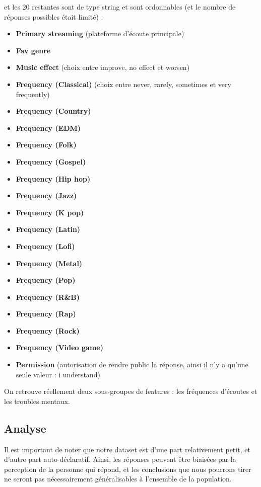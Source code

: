 \documentclass[
]{article}
\providecommand{\tightlist}{%
  \setlength{\itemsep}{0pt}\setlength{\parskip}{0pt}}
\begin{document}
et les 20 restantes sont de type string et sont ordonnables (et le
nombre de réponses possibles était limité) :

\begin{itemize}
\tightlist
\item
  \textbf{Primary streaming} (plateforme d'écoute principale)
\item
  \textbf{Fav genre}
\item
  \textbf{Music effect} (choix entre improve, no effect et worsen)
\item
  \textbf{Frequency (Classical)} (choix entre never, rarely, sometimes
  et very frequently)
\item
  \textbf{Frequency (Country)}
\item
  \textbf{Frequency (EDM)}
\item
  \textbf{Frequency (Folk)}
\item
  \textbf{Frequency (Gospel)}
\item
  \textbf{Frequency (Hip hop)}
\item
  \textbf{Frequency (Jazz)}
\item
  \textbf{Frequency (K pop)}
\item
  \textbf{Frequency (Latin)}
\item
  \textbf{Frequency (Lofi)}
\item
  \textbf{Frequency (Metal)}
\item
  \textbf{Frequency (Pop)}
\item
  \textbf{Frequency (R\&B)}
\item
  \textbf{Frequency (Rap)}
\item
  \textbf{Frequency (Rock)}
\item
  \textbf{Frequency (Video game)}
\item
  \textbf{Permission} (autorisation de rendre public la réponse, ainsi
  il n'y a qu'une seule valeur : i understand)
\end{itemize}

On retrouve réellement deux sous-groupes de features : les fréquences
d'écoutes et les troubles mentaux.

\subsection{Analyse}\label{analyse}

Il est important de noter que notre dataset est d'une part relativement
petit, et d'autre part auto-déclaratif. Ainsi, les réponses peuvent être
biaisées par la perception de la personne qui répond, et les conclusions
que nous pourrons tirer ne seront pas nécessairement généralisables à
l'ensemble de la population.
\end{document}
